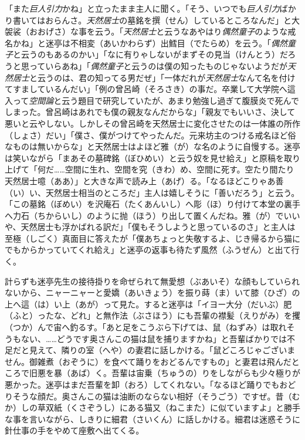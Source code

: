 \documentclass{book}
\begin{document}
「また\emph{巨人引力}かね」と立ったまま主人に聞く。「そう、いつでも\emph{巨人引力}ばかり書いてはおらんさ。\emph{天然居士}の墓銘を撰（せん）しているところなんだ」と大袈裟（おおげさ）な事を云う。「\emph{天然居士}と云うなあやはり\emph{偶然童子}のような戒名かね」と迷亭は不相変（あいかわらず）出鱈目（でたらめ）を云う。「\emph{偶然童子}と云うのもあるのかい」「なに有りゃしないがまずその見当（けんとう）だろうと思っていらあね」「\emph{偶然童子}と云うのは僕の知ったものじゃないようだが\emph{天然居士}と云うのは、君の知ってる男だぜ」「一体だれが\emph{天然居士}なんて名を付けてすましているんだい」「例の曾呂崎（そろさき）の事だ。卒業して大学院へ這入って\emph{空間論}と云う題目で研究していたが、あまり勉強し過ぎて腹膜炎で死んでしまった。曾呂崎はあれでも僕の親友なんだからな」「親友でもいいさ、決して悪いと云やしない。しかしその曾呂崎を天然居士に変化させたのは一体誰の所作（しょさ）だい」「僕さ、僕がつけてやったんだ。元来坊主のつける戒名ほど俗なものは無いからな」と天然居士はよほど雅（が）な名のように自慢する。迷亭は笑いながら「まあその墓碑銘（ぼひめい）と云う奴を見せ給え」と原稿を取り上げて「何だ\ldots{}\ldots{}空間に生れ、空間を究（きわ）め、空間に死す。空たり間たり天然居士噫（ああ）」と大きな声で読み上（あげ）る。「なるほどこりゃあ善（い）い、天然居士相当のところだ」主人は嬉しそうに「善いだろう」と云う。「この墓銘（ぼめい）を沢庵石（たくあんいし）へ彫（ほ）り付けて本堂の裏手へ力石（ちからいし）のように抛（ほう）り出して置くんだね。雅（が）でいいや、天然居士も浮かばれる訳だ」「僕もそうしようと思っているのさ」と主人は至極（しごく）真面目に答えたが「僕あちょっと失敬するよ、じき帰るから猫にでもからかっていてくれ給え」と迷亭の返事も待たず風然（ふうぜん）と出て行く。

計らずも迷亭先生の接待掛りを命ぜられて無愛想（ぶあいそ）な顔もしていられないから、ニャーニャーと愛嬌（あいきょう）を振り蒔（ま）いて膝（ひざ）の上へ這（は）い上（あが）って見た。すると迷亭は「イヨー大分（だいぶ）肥（ふと）ったな、どれ」と無作法（ぶさほう）にも吾輩の襟髪（えりがみ）を攫（つか）んで宙へ釣るす。「あと足をこうぶら下げては、鼠（ねずみ）は取れそうもない、\ldots{}\ldots{}どうです奥さんこの猫は鼠を捕りますかね」と吾輩ばかりでは不足だと見えて、隣りの室（へや）の妻君に話しかける。「鼠どころじゃございません。御雑煮（おぞうに）を食べて踊りをおどるんですもの」と妻君は飛んだところで旧悪を暴（あば）く。吾輩は宙乗（ちゅうの）りをしながらも少々極りが悪かった。迷亭はまだ吾輩を卸（おろ）してくれない。「なるほど踊りでもおどりそうな顔だ。奥さんこの猫は油断のならない相好（そうごう）ですぜ。昔（むか）しの草双紙（くさぞうし）にある猫又（ねこまた）に似ていますよ」と勝手な事を言いながら、しきりに細君（さいくん）に話しかける。細君は迷惑そうに針仕事の手をやめて座敷へ出てくる。
\end{document}
